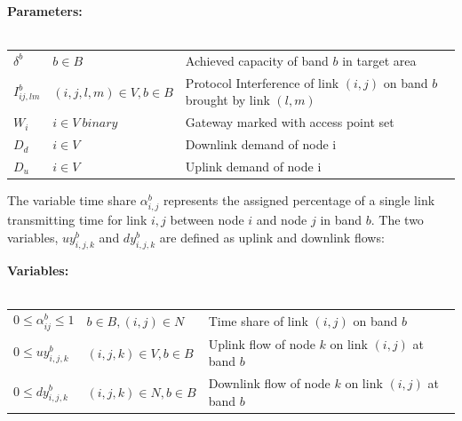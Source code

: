 \noindent
{\bf Parameters:}\\
\\
\begin{tabular}{llp{3.4cm}}
$\delta^b$ & $b \in B$ & Achieved capacity of band $b$ in target area\\
$I_{ij,lm}^b$ & $(i,j,l,m) \in V, b\in B $ & Protocol Interference of link $(i,j)$ on band $b$ brought by link $(l,m)$\\
$W_i$ & $i \in V\ binary$ & Gateway marked with access point set\\
$D_{d}$ & $i \in V\ $ & Downlink demand of node i\\
$D_{u}$ & $i \in V\ $ & Uplink demand of node i\\
\end{tabular}

The variable time share $\alpha_{i,j}^b$ represents the assigned percentage of a single link transmitting time  
for link $i,j$ between node $i$ and node $j$ in band $b$. 
The two variables, $uy_{i,j,k}^{b}$ and $dy_{i,j,k}^{b}$ are defined as uplink and downlink flows:

\noindent
{\bf Variables:}\\
\\
\begin{tabular}{llp{3cm}}
$0\le \alpha_{ij}^b \le 1$  & $b\in B, (i,j) \in N$ & 
Time share of link $(i,j)$ on band $b$\\ 
$0\le uy_{i,j,k}^b$ & $(i,j,k) \in V, b \in B$ & 
Uplink flow of node $k$ on link $(i,j)$ at band $b$ \\ 
$0\le dy_{i,j,k}^b$ & $(i,j,k) \in N, b \in B$ & 
Downlink flow of node $k$ on link $(i,j)$ at band $b$ \\ 
\end{tabular}
\vspace{1pt}

